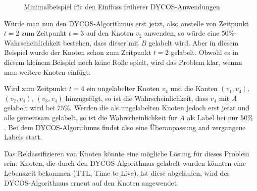 \begin{figure}[ht]
    \centering
    \subfloat[$t=1$]{
        
        \label{fig:graph-t1}
    }%
    \subfloat[$t=2$]{
        
        \label{fig:graph-t2}
    }

    \subfloat[$t=3$]{
        
        \label{fig:graph-t3}
    }%
    \label{Formen}
    \caption{Minimalbeispiel für den Einfluss früherer DYCOS-Anwendungen}
\end{figure}

Würde man nun den DYCOS-Algorithmus erst jetzt, also anstelle von
Zeitpunkt $t=2$ zum Zeitpunkt $t=3$ auf den Knoten $v_2$ anwenden, so
würde eine $50\%$-Wahrscheinlichkeit bestehen, dass dieser mit $B$ 
gelabelt wird. Aber in diesem Beispiel wurde der Knoten schon
zum Zeitpunkt $t=2$ gelabelt. Obwohl es in diesem kleinem Beispiel
noch keine Rolle spielt, wird das Problem klar, wennn man weitere
Knoten einfügt:

Wird zum Zeitpunkt $t=4$ ein ungelabelter Knoten $v_4$ und die Kanten
$(v_1, v_4)$, $(v_2, v_4)$, $(v_3, v_4)$ hinzugefügt, so ist die 
Wahrscheinlichkeit, dass $v_4$ mit $A$ gelabelt wird bei $75\%$.
Werden die als ungelabelten Knoten jedoch erst jetzt und alle gemeinsam
gelabelt, so ist die Wahrscheinlichkeit für $A$ als Label bei nur $50\%$.
Bei dem DYCOS-Algorithmus findet also eine Überanpassung and vergangene
Labels statt.

Das Reklassifizieren von Knoten könnte eine mögliche Lösung für dieses
Problem sein. Knoten, die durch den DYCOS-Algorithmus gelabelt wurden
könnten eine Lebenszeit bekommen (TTL, Time to Live). Ist diese 
abgelaufen, wird der DYCOS-Algorithmus erneut auf den Knoten angewendet.

